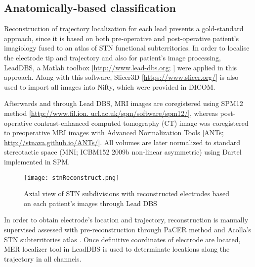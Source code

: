 \subsection{Anatomically-based classification}

Reconstruction of trajectory localization for each lead presents a gold-standard approach, since it is based on both pre-operative and post-operative patient's imagiology fused to an atlas of STN functional subterritories. In order to localise the electrode tip and trajectory and also for patient's image processing, LeadDBS, a Matlab toolbox [\url{http://www.lead-dbs.org}; \cite{Horn2015}] were applied in this approach. Along with this software, Slicer3D [\url{https://www.slicer.org/}] is also used to import all images into Nifty, which were provided in DICOM.

Afterwards and through Lead DBS, MRI images are coregistered using SPM12 method [\url{http://www.fil.ion. ucl.ac.uk/spm/software/spm12/}], whereas post-operative contrast-enhanced computed tomography (CT) image was coregistered to preoperative MRI images with Advanced Normalization Tools [ANTs; \url{http://stnava.github.io/ANTs/}]. All volumes are later normalized to standard stereotactic space (MNI; ICBM152 2009b non-linear asymmetric) using Dartel implemented in SPM.

\begin{figure}[!htb]
     \centering    
     \texttt{[image: stnReconstruct.png]}
       \caption{Axial view of STN subdivisions with reconstructed electrodes based on each patient’s images through Lead DBS }
     \label{fig:spkSorting}
\end{figure}

In order to obtain electrode's location and trajectory, reconstruction is manually supervised assessed with pre-reconstruction through PaCER method and Acolla's STN subterritories atlas \cite{Accolla2014, Husch2018}. Once definitive coordinates of electrode are located, MER localizer tool in LeadDBS is used to determinate locations along the trajectory in all channels.

